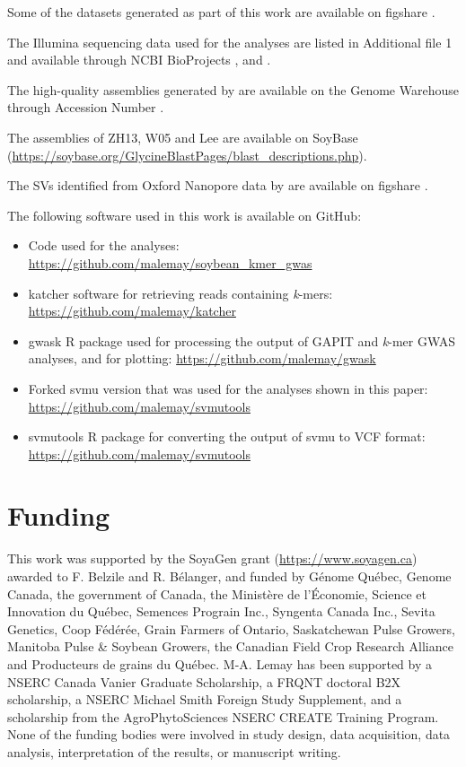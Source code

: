 Some of the datasets generated as part of this work are available on figshare
\citep{kmer-gwas-figshare}.

The Illumina sequencing data used for the analyses are listed in Additional file 1
and available through NCBI BioProjects \citeauthor{PRJNA257011}, \citeauthor{PRJNA289660}
and \citeauthor{PRJNA639876}.

The high-quality assemblies generated by \cite{liu2020-pangenome} are available
on the Genome Warehouse through Accession Number \citeauthor{PRJCA002030}.

The assemblies of ZH13, W05 and Lee are available on SoyBase
(\url{https://soybase.org/GlycineBlastPages/blast_descriptions.php}).

The SVs identified from Oxford Nanopore data by \cite{lemay2022} are available
on figshare \citep{soybean-sv-figshare}.

The following software used in this work is available on GitHub:

\begin{itemize}
	\item Code used for the analyses:
		\url{https://github.com/malemay/soybean_kmer_gwas}
	\item katcher software for retrieving reads containing \textit{k}-mers:
		\url{https://github.com/malemay/katcher}
	\item gwask R package used for processing the output of GAPIT and
		\textit{k}-mer GWAS analyses, and for plotting:
		\url{https://github.com/malemay/gwask}
	\item Forked svmu version that was used for the analyses shown in this
		paper: \url{https://github.com/malemay/svmutools}
	\item svmutools R package for converting the output of svmu to VCF
		format: \url{https://github.com/malemay/svmutools}
\end{itemize}

\section*{Funding}
\label{sv-gwas-funding}

This work was supported by the SoyaGen grant (\url{https://www.soyagen.ca})
awarded to F. Belzile and R. Bélanger, and funded by Génome Québec, Genome
Canada, the government of Canada, the Ministère de l'Économie, Science et
Innovation du Québec, Semences Prograin Inc., Syngenta Canada Inc., Sevita
Genetics, Coop Fédérée, Grain Farmers of Ontario, Saskatchewan Pulse Growers,
Manitoba Pulse \& Soybean Growers, the Canadian Field Crop Research Alliance
and Producteurs de grains du Québec. M-A. Lemay has been supported by a NSERC
Canada Vanier Graduate Scholarship, a FRQNT doctoral B2X scholarship, a NSERC
Michael Smith Foreign Study Supplement, and a scholarship from the
AgroPhytoSciences NSERC CREATE Training Program. None of the funding bodies
were involved in study design, data acquisition, data analysis, interpretation
of the results, or manuscript writing.

